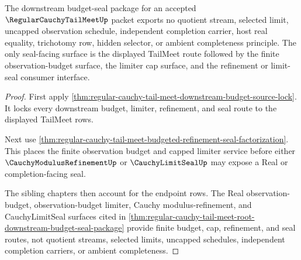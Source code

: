 \begin{theorem}
\label{thm:regular-cauchy-tail-meet-seal-package-nonescape}
The downstream budget-seal package for an accepted $\RegularCauchyTailMeetUp$ packet exports no quotient stream, selected limit, uncapped observation schedule, independent completion carrier, host real equality, trichotomy row, hidden selector, or ambient completeness principle. The only seal-facing surface is the displayed TailMeet route followed by the finite observation-budget surface, the limiter cap surface, and the refinement or limit-seal consumer interface.
\end{theorem}
\begin{proof}
First apply \autoref{thm:regular-cauchy-tail-meet-downstream-budget-source-lock}. It locks every downstream budget, limiter, refinement, and seal route to the displayed TailMeet rows.

Next use \autoref{thm:regular-cauchy-tail-meet-budgeted-refinement-seal-factorization}. This places the finite observation budget and capped limiter service before either $\CauchyModulusRefinementUp$ or $\CauchyLimitSealUp$ may expose a Real or completion-facing seal.

The sibling chapters then account for the endpoint rows. The Real observation-budget, observation-budget limiter, Cauchy modulus-refinement, and CauchyLimitSeal surfaces cited in \autoref{thm:regular-cauchy-tail-meet-root-downstream-budget-seal-package} provide finite budget, cap, refinement, and seal routes, not quotient streams, selected limits, uncapped schedules, independent completion carriers, or ambient completeness.
\end{proof}

